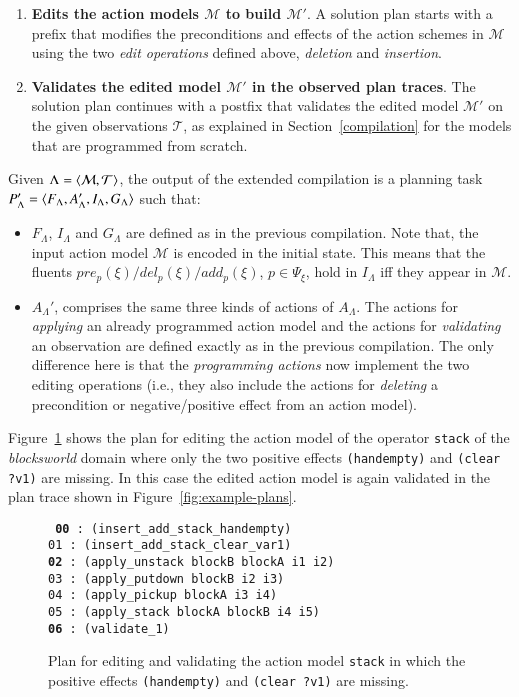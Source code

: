 \begin{enumerate}
\item {\bf Edits the action models $\mathcal{M}$ to build $\mathcal{M}'$}. A solution plan starts with a prefix that modifies the preconditions and effects of the action schemes in $\mathcal{M}$ using the two {\em edit operations} defined above, {\em deletion} and {\em insertion}.
\item {\bf Validates the edited model $\mathcal{M}'$ in the observed plan traces}. The solution plan continues with a postfix that validates the edited model $\mathcal{M}'$ on the given observations $\mathcal{T}$, as explained in Section~\ref{compilation} for the models that are programmed from scratch.
\end{enumerate}

Given $\Lambda={\langle \mathcal{M},\mathcal{T} \rangle}$, the output of the extended compilation is a planning task $P_{\Lambda}'={\langle F_{\Lambda},A_{\Lambda}',I_{\Lambda},G_{\Lambda} \rangle}$ such that:

\begin{itemize}
\item $F_{\Lambda}$, $I_{\Lambda}$ and $G_{\Lambda}$ are defined as in the previous compilation. Note that, the input action model $\mathcal{M}$ is encoded in the initial state. This means that the fluents $pre_p(\xi)/del_p(\xi)/add_p(\xi)$, $p\in \Psi_\xi$, hold in $I_{\Lambda}$ iff they appear in $\mathcal{M}$.
\item $A_{\Lambda}'$, comprises the same three kinds of actions of $A_{\Lambda}$. The actions for {\em applying} an already programmed action model and the actions for {\em validating} an observation are defined exactly as in the previous compilation. The only difference here is that the {\em programming actions} now implement the two editing operations (i.e., they also include the actions for {\em deleting} a precondition or negative/positive effect from an action model).
\end{itemize}

Figure~\ref{fig:plan-pdistance} shows the plan for editing the action model of the operator {\tt\small stack} of the {\em blocksworld} domain where only the two positive effects {\tt\small (handempty)} and {\tt\small (clear ?v1)} are missing. In this case the edited action model is again validated in the plan trace shown in Figure~\ref{fig:example-plans}.

\begin{figure}[hbt!]
{\footnotesize\tt
  {\bf 00} : (insert\_add\_stack\_handempty)\\
  01 : (insert\_add\_stack\_clear\_var1)\\
  {\bf 02} : (apply\_unstack blockB blockA i1 i2)\\
  03 : (apply\_putdown blockB i2 i3)\\
  04 : (apply\_pickup blockA i3 i4)\\
  05 : (apply\_stack blockA blockB i4 i5)\\
  {\bf 06} : (validate\_1)
}
\caption{\small Plan for editing and validating the action model {\tt\small{stack}} in which the positive effects {\tt\small{(handempty)}} and {\tt\small{(clear ?v1)}} are missing.}
\label{fig:plan-pdistance}
\end{figure}

